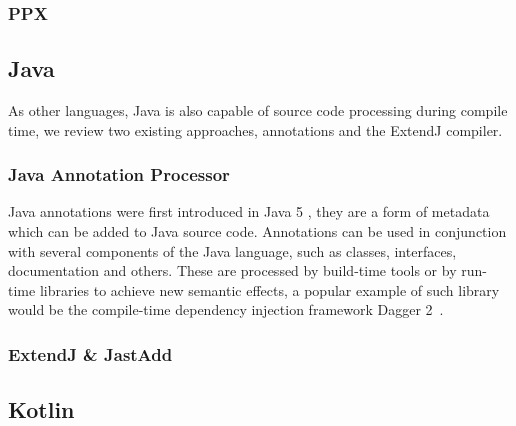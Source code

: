 \subsubsection*{PPX}\label{sec:lang-preprocessors:ocaml:ppx}

\subsection{Java}\label{sec:lang-preprocessors:java}

As other languages, Java is also capable of source code processing during compile time,
we review two existing approaches, annotations and the ExtendJ compiler.

\subsubsection*{Java Annotation Processor}\label{sec:lang-preprocessors:java:annotation}

Java annotations were first introduced in Java 5 \autocite{JSR269},
they are a form of metadata which can be added to Java source code.
Annotations can be used in conjunction with several components of the Java language,
such as classes, interfaces, documentation and others.
These are processed by build-time tools or by run-time libraries to achieve new semantic effects,
a popular example of such library would be the compile-time dependency injection framework Dagger 2~\autocite{Dagger2}.



\subsubsection*{ExtendJ \& JastAdd}\label{sec:lang-preprocessors:java:extendj}

\subsection{Kotlin}\label{sec:lang-preprocessors:kotlin}

